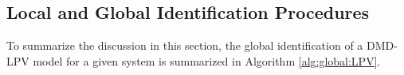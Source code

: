 \begin{comment}

\end{comment}

\subsection{Local and Global Identification Procedures}

To summarize the discussion in this section, the global identification of a DMD-LPV model for a given system is summarized in Algorithm \ref{alg:global:LPV}.



